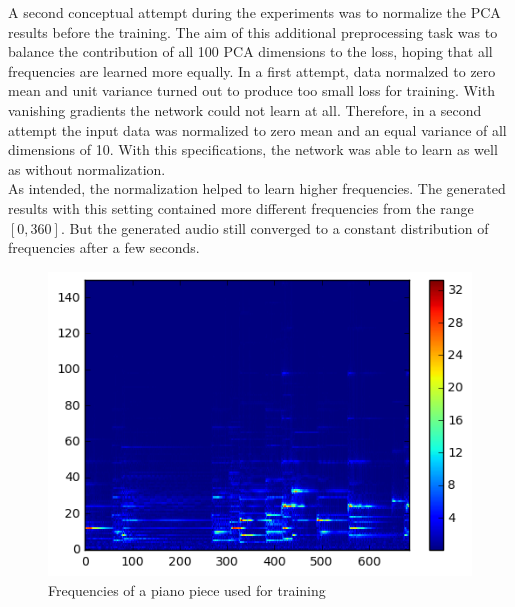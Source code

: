 \documentclass[10pt,conference,compsocconf]{IEEEtran}
\begin{document}
A second conceptual attempt during the experiments was to normalize the PCA results before the training. The aim of this additional preprocessing task was to balance the contribution of all 100 PCA dimensions to the loss, hoping that all frequencies are learned more equally. In a first attempt, data normalzed to zero mean and unit variance turned out to produce too small loss for training. With vanishing gradients the network could not learn at all. Therefore, in a second attempt the input data was normalized to zero mean and an equal variance of all dimensions of 10. With this specifications, the network was able to learn as well as without normalization.\\
As intended, the normalization helped to learn higher frequencies. The generated results with this setting contained more different frequencies from the range $[0,360]$. But the generated audio still converged to a constant distribution of frequencies after a few seconds. 
\begin{figure}[tbp]
  \centering
  \includegraphics[width=\columnwidth]{figures/original_frequencies.png}
  \caption{Frequencies of a piano piece used for training}
  \label{fig:original_frequencies}
\end{figure}
\end{document}
